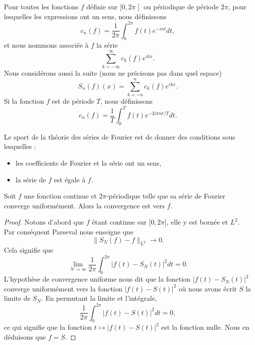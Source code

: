 \begin{definition}      \label{DEFooJUUIooNMdCtN}
    Pour toutes les fonctions \( f\) définie sur \( \mathopen[ 0 , 2\pi \mathclose[\) ou périodique de période \( 2\pi\), pour lesquelles les expressions ont un sens, nous définissons
    \begin{equation}    \label{EqNDBaXRL}
        c_n(f)=\frac{1}{ 2\pi }\int_0^{2\pi}f(t) e^{-int}dt,
    \end{equation}
    et nous nommons  associée à \( f\) la série
    \begin{equation}
        \sum_{k=-\infty}^{\infty}c_k(f) e^{ikx}.
    \end{equation}
    Nous considérons aussi la suite (nous ne précisons pas dans quel espace)
    \begin{equation}
        S_n(f)(x)=\sum_{k=-n}^nc_k(f) e^{ikx}.
    \end{equation}
    Si la fonction \( f\) est de période \( T\), nous définissons
    \begin{equation}        \label{EQooBOFSooFCJXzu}
        c_n(f)=\frac{1}{ T }\int_0^Tf(t) e^{-2 i \pi n t/T}dt.
    \end{equation}
\end{definition}

Le sport de la théorie des séries de Fourier est de donner des conditions sous lesquelles :
\begin{itemize}
    \item les coefficients de Fourier et la série ont un sens,
    \item la série de \( f\) est égale à \( f\).
\end{itemize}

\begin{proposition}  \label{PropmrLfGt}
    Soit \( f\) une fonction continue et \( 2\pi\)-périodique telle que sa série de Fourier converge uniformément. Alors la convergence est vers \( f\).
\end{proposition}

\begin{proof}
    Notons d'abord que \( f\) étant continue sur \(\mathopen[ 0 , 2\pi \mathclose]\), elle y est bornée et \( L^2\). Par conséquent Parseval nous enseigne que
    \begin{equation}
        \| S_N(f)-f \|_{L^2}\to 0.
    \end{equation}
    Cela signifie que
    \begin{equation}
        \lim_{N\to \infty} \frac{1}{ 2\pi }\int_{0}^{2\pi}| f(t)-S_N(t) |^2dt=0.
    \end{equation}
    L'hypothèse de convergence uniforme nous dit que la fonction \( | f(t)-S_N(t) |^2\) converge uniformément vers la fonction \( | f(t)-S(t) |^2\) où nous avons écrit \( S\) la limite de \( S_N\). En permutant la limite et l'intégrale,
    \begin{equation}
        \frac{1}{ 2\pi }\int_0^{2\pi}| f(t)-S(t) |^2dt=0,
    \end{equation}
    ce qui signifie que la fonction \( t\mapsto | f(t)-S(t) |^2\) est la fonction nulle. Nous en déduisons que \( f=S\).
\end{proof}

